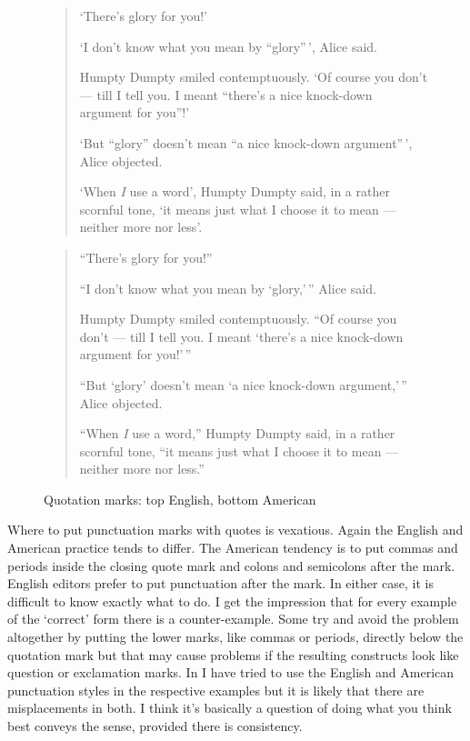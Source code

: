 \documentclass[10pt,letterpaper]{memoir}
\begin{document}
\begin{figure}
\centering
\begin{minipage}{\textwidth}
\mbox{}\hrulefill\mbox{}
\begin{quotation}
    `There's glory for you!' 

    `I don't know what you mean by ``glory''\,', Alice said. 

    Humpty Dumpty smiled contemptuously. `Of course you don't --- till I tell
you. I meant ``there's a nice knock-down argument for you''!' 

    `But ``glory'' doesn't mean ``a nice knock-down argument''\,', Alice
objected. 

    `When \emph{I} use a word', Humpty Dumpty said, in a rather scornful
tone, `it means just what I choose it to mean --- neither more nor less'.
\end{quotation}
\mbox{}\hrulefill\mbox{}
\begin{quotation}
     ``There's glory for you!'' 

    ``I don't know what you mean by `glory,'\,'' Alice said. 

    Humpty Dumpty smiled contemptuously. ``Of course you don't --- till I tell
you. I meant `there's a nice knock-down argument for you!'\,'' 

    ``But `glory' doesn't mean `a nice knock-down argument,'\,'' Alice
objected. 

    ``When \emph{I} use a word,'' Humpty Dumpty said, in a rather scornful
tone, ``it means just what I choose it to mean --- neither more nor less.''
\end{quotation}
\mbox{}\hrulefill\mbox{}
\end{minipage}
\caption{Quotation marks: top English, bottom American}\label{fig:qmarks}
\end{figure}

    Where to put punctuation marks with quotes is vexatious. Again the
English and American practice tends to differ. The American tendency is
to put commas and periods inside the closing quote mark and colons and
semicolons after the mark. English editors prefer to put punctuation
after the mark.
In either case, it is difficult
to know exactly what to do. I get the impression that for every example
of the `correct' form there is a counter-example.
Some try and avoid the problem altogether by putting the lower marks, 
like commas or periods, 
directly below the quotation mark but that may cause problems if the 
resulting constructs look like question or exclamation marks. 
In  I have tried to use the English and American 
punctuation styles in the respective examples but it is likely that there
are misplacements in both. I think it's basically a question of doing what
you think best conveys the sense, provided there is consistency.
\end{document}
